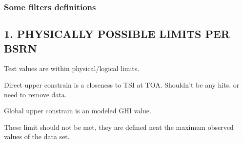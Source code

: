 \documentclass[
  10pt,
  a4paper,oneside]{article}
\newenvironment{Shaded}{\begin{snugshade}}{\end{snugshade}}
\newcommand{\CommentTok}[1]{\textcolor[rgb]{0.56,0.35,0.01}{\textit{#1}}}
\newcommand{\DecValTok}[1]{\textcolor[rgb]{0.00,0.00,0.81}{#1}}
\newcommand{\FloatTok}[1]{\textcolor[rgb]{0.00,0.00,0.81}{#1}}
\newcommand{\KeywordTok}[1]{\textcolor[rgb]{0.13,0.29,0.53}{\textbf{#1}}}
\newcommand{\NormalTok}[1]{#1}
\newcommand{\OperatorTok}[1]{\textcolor[rgb]{0.81,0.36,0.00}{\textbf{#1}}}
\newcommand{\StringTok}[1]{\textcolor[rgb]{0.31,0.60,0.02}{#1}}
\begin{document}
\hypertarget{some-filters-definitions}{%
\subsubsection{Some filters definitions}\label{some-filters-definitions}}

\begin{Shaded}
\end{Shaded}

\newpage

\hypertarget{physically-possible-limits-per-bsrn}{%
\subsection{1. PHYSICALLY POSSIBLE LIMITS PER BSRN}\label{physically-possible-limits-per-bsrn}}

Test values are within physical/logical limits.

Direct upper constrain is a closeness to TSI at TOA. Shouldn't be any hits.
or need to remove data.

Global upper constrain is an modeled GHI value.

These limit should not be met, they are defined neat the maximum observed
values of the data set.
\end{document}
